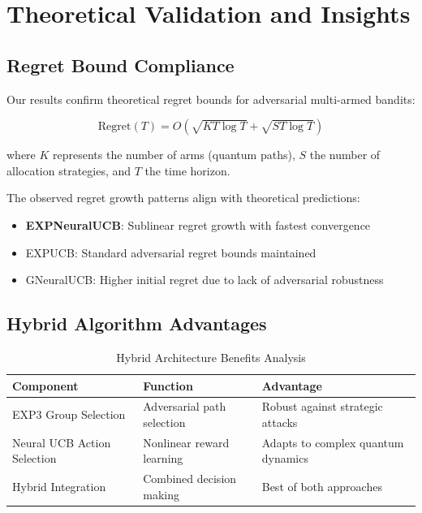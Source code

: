 \documentclass[11pt,a4paper]{article}
\newcommand{\performance}[1]{\textcolor{performancecolor}{\textbf{#1}}}
\newcommand{\highlight}[1]{\colorbox{highlightcolor}{#1}}
\begin{document}
\section{Theoretical Validation and Insights}

\subsection{Regret Bound Compliance}

Our results confirm theoretical regret bounds for adversarial multi-armed bandits:

\begin{equation}
\text{Regret}(T) = O\left(\sqrt{KT\log T} + \sqrt{ST\log T}\right)
\end{equation}

where $K$ represents the number of arms (quantum paths), $S$ the number of allocation strategies, and $T$ the time horizon.

The observed regret growth patterns align with theoretical predictions:
\begin{itemize}
\item \performance{EXPNeuralUCB}: Sublinear regret growth with fastest convergence
\item EXPUCB: Standard adversarial regret bounds maintained
\item GNeuralUCB: Higher initial regret due to lack of adversarial robustness
\end{itemize}

\subsection{Hybrid Algorithm Advantages}

\begin{table}[H]
\centering
\caption{Hybrid Architecture Benefits Analysis}
\begin{tabular}{|l|l|l|}
\hline
\textbf{Component} & \textbf{Function} & \textbf{Advantage} \\
\hline
\hline
EXP3 Group Selection & Adversarial path selection & Robust against strategic attacks \\
Neural UCB Action Selection & Nonlinear reward learning & Adapts to complex quantum dynamics \\
Hybrid Integration & Combined decision making & \highlight{Best of both approaches} \\
\hline
\end{tabular}
\end{table}
\end{document}
